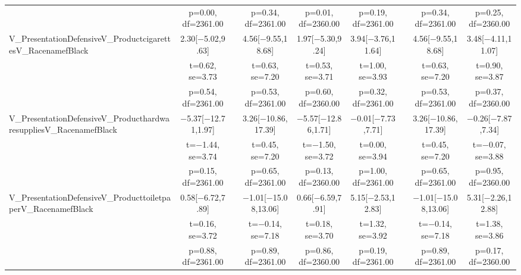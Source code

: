 \documentclass[]{report}
\begin{document}
\begin{table}
{\begin{tabular}[t]{lcccccccc}
		& p=\num{0.00}, df=\num{2361.00} &  & p=\num{0.34}, df=\num{2361.00} & p=\num{0.01}, df=\num{2360.00} & p=\num{0.19}, df=\num{2361.00} &  & p=\num{0.34}, df=\num{2361.00} & p=\num{0.25}, df=\num{2360.00}\\
		V\_PresentationDefensiveV\_ProductcigarettesV\_RacenamefBlack & \num{2.30}[\num{-5.02},\num{9.63}] &  & \num{4.56}[\num{-9.55},\num{18.68}] & \num{1.97}[\num{-5.30},\num{9.24}] & \num{3.94}[\num{-3.76},\num{11.64}] &  & \num{4.56}[\num{-9.55},\num{18.68}] & \num{3.48}[\num{-4.11},\num{11.07}]\\
		& t=\num{0.62}, se=\num{3.73} &  & t=\num{0.63}, se=\num{7.20} & t=\num{0.53}, se=\num{3.71} & t=\num{1.00}, se=\num{3.93} &  & t=\num{0.63}, se=\num{7.20} & t=\num{0.90}, se=\num{3.87}\\
		& p=\num{0.54}, df=\num{2361.00} &  & p=\num{0.53}, df=\num{2361.00} & p=\num{0.60}, df=\num{2360.00} & p=\num{0.32}, df=\num{2361.00} &  & p=\num{0.53}, df=\num{2361.00} & p=\num{0.37}, df=\num{2360.00}\\
		V\_PresentationDefensiveV\_ProducthardwaresuppliesV\_RacenamefBlack & \num{-5.37}[\num{-12.71},\num{1.97}] &  & \num{3.26}[\num{-10.86},\num{17.39}] & \num{-5.57}[\num{-12.86},\num{1.71}] & \num{-0.01}[\num{-7.73},\num{7.71}] &  & \num{3.26}[\num{-10.86},\num{17.39}] & \num{-0.26}[\num{-7.87},\num{7.34}]\\
		& t=\num{-1.44}, se=\num{3.74} &  & t=\num{0.45}, se=\num{7.20} & t=\num{-1.50}, se=\num{3.72} & t=\num{0.00}, se=\num{3.94} &  & t=\num{0.45}, se=\num{7.20} & t=\num{-0.07}, se=\num{3.88}\\
		& p=\num{0.15}, df=\num{2361.00} &  & p=\num{0.65}, df=\num{2361.00} & p=\num{0.13}, df=\num{2360.00} & p=\num{1.00}, df=\num{2361.00} &  & p=\num{0.65}, df=\num{2361.00} & p=\num{0.95}, df=\num{2360.00}\\
		V\_PresentationDefensiveV\_ProducttoiletpaperV\_RacenamefBlack & \num{0.58}[\num{-6.72},\num{7.89}] &  & \num{-1.01}[\num{-15.08},\num{13.06}] & \num{0.66}[\num{-6.59},\num{7.91}] & \num{5.15}[\num{-2.53},\num{12.83}] &  & \num{-1.01}[\num{-15.08},\num{13.06}] & \num{5.31}[\num{-2.26},\num{12.88}]\\
		& t=\num{0.16}, se=\num{3.72} &  & t=\num{-0.14}, se=\num{7.18} & t=\num{0.18}, se=\num{3.70} & t=\num{1.32}, se=\num{3.92} &  & t=\num{-0.14}, se=\num{7.18} & t=\num{1.38}, se=\num{3.86}\\
		& p=\num{0.88}, df=\num{2361.00} &  & p=\num{0.89}, df=\num{2361.00} & p=\num{0.86}, df=\num{2360.00} & p=\num{0.19}, df=\num{2361.00} &  & p=\num{0.89}, df=\num{2361.00} & p=\num{0.17}, df=\num{2360.00}\\

\end{tabular}}
\end{table}
\end{document}
